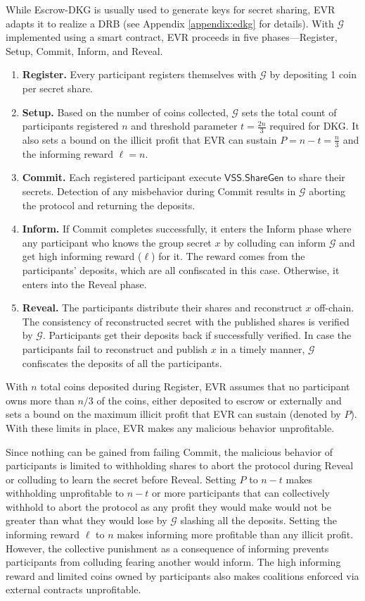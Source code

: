 \documentclass[letterpaper,twocolumn,10pt]{article}
\theoremstyle{definition}
\theoremstyle{remark}
\begin{document}
While Escrow-DKG is usually used to generate keys for secret sharing, EVR adapts it to realize a DRB (see Appendix \ref{appendix:edkg} for details). With $\mathcal{G}$ implemented using a smart contract, EVR proceeds in five phases---Register, Setup, Commit, Inform, and Reveal.
\begin{enumerate}
    \item \textbf{Register.} Every participant registers themselves with $\mathcal{G}$ by depositing 1 coin per secret share.
    \item \textbf{Setup.}  Based on the number of coins collected, $\mathcal{G}$ sets the total count of participants registered $n$ and threshold parameter $t = \frac{2n}{3}$ required for DKG. It also sets a bound on the illicit profit that EVR can sustain $P= n-t = \frac{n}{3}$ and the informing reward $\ell = n$.
    \item \textbf{Commit.} Each registered participant execute $\mathsf{VSS.ShareGen}$ to share their secrets. Detection of any misbehavior during Commit results in $\mathcal{G}$ aborting the protocol and returning the deposits.
     \item \textbf{Inform.} If Commit completes successfully, it enters the Inform phase where any participant who knows the group secret $x$ by colluding can inform $\mathcal{G}$ and get high informing reward ($\ell$) for it. The reward comes from the participants’ deposits, which are all confiscated in this case. Otherwise, it enters into the Reveal phase.
    \item \textbf{Reveal.} The participants distribute their shares and reconstruct $x$ off-chain. The consistency of reconstructed secret with the published shares is verified by $\mathcal{G}$. Participants get their deposits back if successfully verified. In case the participants fail to reconstruct and publish $x$ in a timely manner, $\mathcal{G}$ confiscates the deposits of all the participants.
\end{enumerate}
With $n$ total coins deposited during Register, EVR assumes that no participant owns more than $n/3$ of the coins, either deposited to escrow or externally and sets a bound on the maximum illicit profit that EVR can sustain (denoted by $P$). With these limits in place, EVR makes any malicious behavior unprofitable. 

Since nothing can be gained from failing Commit, the malicious behavior of participants is limited to withholding shares to abort the protocol during Reveal or colluding to learn the secret before Reveal. Setting $P$ to $n-t$ makes withholding unprofitable to $n-t$ or more participants that can collectively withhold to abort the protocol as any profit they would make would not be greater than what they would lose by $\mathcal{G}$ slashing all the deposits. Setting the informing reward $\ell$ to $n$ makes informing more profitable than any illicit profit. However, the collective punishment as a consequence of informing prevents participants from colluding fearing another would inform. The high informing reward and limited coins owned by participants also makes coalitions enforced via external contracts unprofitable.
\end{document}
